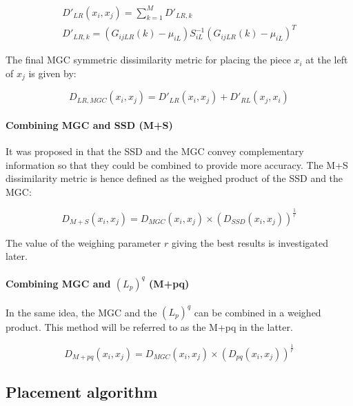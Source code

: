 \begin{gather}
    D'_{LR}(x_i,x_j) = \sum_{k=1}^{M} D'_{LR,k}\\
    D'_{LR,k} = \left( G_{ijLR}(k) - \mu_{iL} \right) S_{iL}^{-1} \left( G_{ijLR}(k) - \mu_{iL} \right)^T
\end{gather}

The final MGC symmetric dissimilarity metric for placing the piece $x_i$ at the left of $x_j$ is given by:

\begin{equation}
    D_{LR,MGC}(x_i,x_j) = D'_{LR}(x_i,x_j) +  D'_{RL}(x_j,x_i)
\end{equation}

\paragraph{Combining MGC and SSD (M+S)} \mbox{}

It was proposed in \cite{robust} that the SSD and the MGC convey complementary information so that they could be combined to provide more accuracy. The M+S dissimilarity metric is hence defined as the weighed product of the SSD and the MGC:

\begin{equation}\label{eq:ms}
    D_{M+S}(x_i,x_j) = D_{MGC}(x_i,x_j) \times \left( D_{SSD}(x_i,x_j) \right)^{\frac{1}{r}}
\end{equation}

The value of the weighing parameter $r$ giving the best results is investigated later.


\paragraph{Combining MGC and $(L_p)^q$ (M+pq)} \mbox{}

In the same idea, the MGC and the $(L_p)^q$ can be combined in a weighed product. This method will be referred to as the M+pq in the latter.

\begin{equation}\label{eq:mpq}
    D_{M+pq}(x_i,x_j) = D_{MGC}(x_i,x_j) \times \left( D_{pq}(x_i,x_j) \right)^{\frac{1}{r}}
\end{equation}

\subsection{Placement algorithm}

